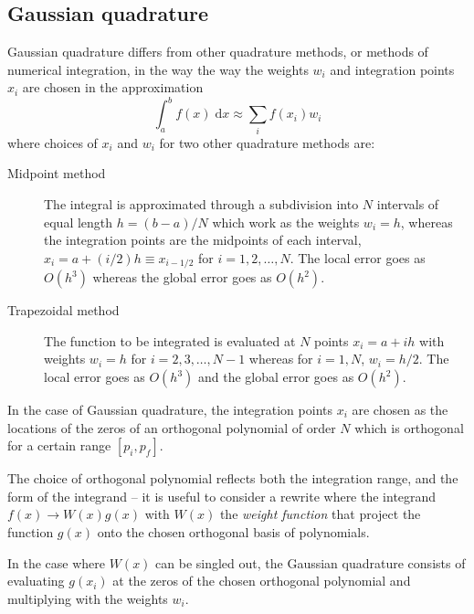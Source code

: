 \documentclass[a4paper,11pt]{article}
\newcommand{\diff}{\ensuremath{\; \text{d}}}
\begin{document}
\subsection{Gaussian quadrature}
Gaussian quadrature differs from other quadrature methods, or methods of numerical integration, in the way the way the weights $w_i$ and integration points $x_i$ are chosen in the approximation
\begin{equation}
    \int_{a}^{b} f(x) \diff x \approx \sum_i f(x_i) w_i
    \label{eq:numint}
\end{equation}
where choices of $x_i$ and $w_i$ for two other quadrature methods are:
\begin{description}
    \item[Midpoint method] The integral is approximated through a subdivision into $N$ intervals of equal length $h = (b-a)/N$ which work as the weights $w_i = h$, whereas the integration points are the midpoints of each interval, $x_i = a + (i/2) h \equiv x_{i-1/2}$ for $i=1,2,\dots,N$. The local error goes as $O(h^3)$ whereas the global error goes as $O(h^2)$.
    \item[Trapezoidal method] The function to be integrated is evaluated at $N$ points $x_i = a + ih$ with weights $w_i = h$ for $i=2,3,\dots,N-1$ whereas for $i=1,N$, $w_i = h/2$. The local error goes as $O(h^3)$ and the global error goes as $O(h^2)$. 
\end{description} 

In the case of Gaussian quadrature, the integration points $x_i$ are chosen as the locations of the zeros of an orthogonal polynomial of order $N$ which is orthogonal for a certain range $[p_i, p_f]$.  

The choice of orthogonal polynomial reflects both the integration range, and the form of the integrand -- it is useful to consider a rewrite where the integrand $f(x) \to W(x) g(x)$ with $W(x)$ the \textit{weight function} that project the function $g(x)$ onto the chosen orthogonal basis of polynomials. 

In the case where $W(x)$ can be singled out, the Gaussian quadrature consists of evaluating $g(x_i)$ at the zeros of the chosen orthogonal polynomial and multiplying with the weights $w_i$.
\end{document}
